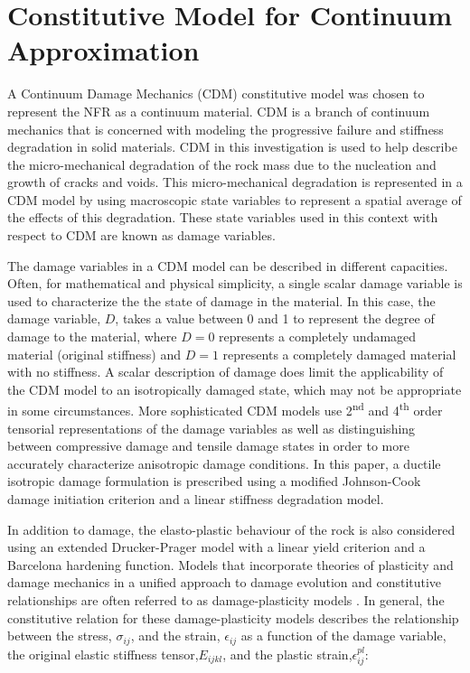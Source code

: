 \section{Constitutive Model for Continuum Approximation}

A Continuum Damage Mechanics (CDM) constitutive model was chosen to represent the NFR as a continuum material. CDM is a branch of continuum mechanics that is concerned with modeling the progressive failure and stiffness degradation in solid materials. CDM in this investigation is used to help describe the micro-mechanical degradation of the rock mass due to the nucleation and growth of cracks and voids. This micro-mechanical degradation is represented in a CDM model by using macroscopic state variables to represent a spatial average of the effects of this degradation. These state variables used in this context with respect to CDM are known as damage variables. 

The damage variables in a CDM model can be described in different capacities. Often, for mathematical and physical simplicity, a single scalar damage variable is used to characterize the the state of damage in the material. In this case, the damage variable, $D$, takes a value between 0 and 1 to represent the degree of damage to the material, where $D=0$ represents a completely undamaged material (original stiffness) and $D=1$ represents a completely damaged material with no stiffness. A scalar description of damage does limit the applicability of the CDM model to an isotropically damaged state, which may not be appropriate in some circumstances. More sophisticated CDM models use 2\textsuperscript{nd} and 4\textsuperscript{th} order tensorial representations of the damage variables as well as distinguishing between compressive damage and tensile damage states in order to more accurately characterize anisotropic damage conditions. In this paper, a ductile isotropic damage formulation is prescribed using a modified Johnson-Cook damage initiation criterion and a linear stiffness degradation model.

In addition to damage, the elasto-plastic behaviour of the rock is also considered using an extended Drucker-Prager model with a linear yield criterion and a Barcelona hardening function. Models that incorporate theories of plasticity and damage mechanics in a unified approach to damage evolution and constitutive relationships are often referred to as damage-plasticity models \citep{zhang_continuum_2010}. In general, the constitutive relation for these damage-plasticity models describes the relationship between the stress, $\sigma_{ij}$, and the strain, $\epsilon_{ij}$ as a function of the damage variable, the original elastic stiffness tensor,$E_{ijkl}$, and the plastic strain,$\epsilon^{pl}_{ij}$: 

